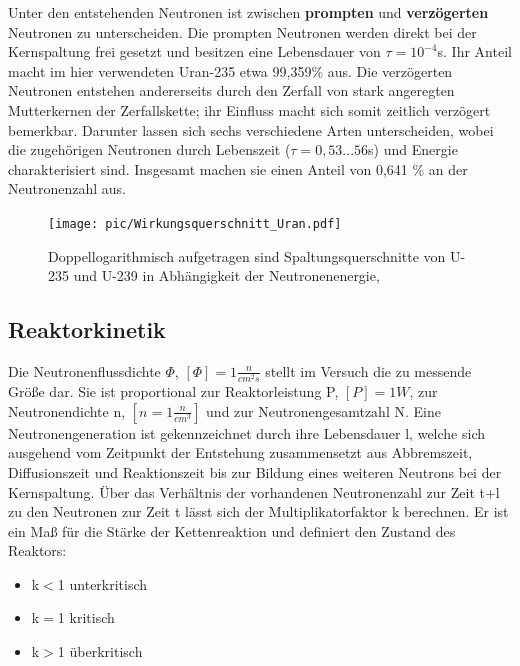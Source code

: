 	Unter den entstehenden Neutronen ist zwischen \textbf{prompten} und \textbf{verzögerten} Neutronen zu unterscheiden. Die prompten Neutronen werden direkt bei der Kernspaltung frei gesetzt und besitzen eine Lebensdauer von $\tau = 10^{-4}$s. Ihr Anteil macht im hier verwendeten Uran-235 etwa 99,359$\%$ aus. Die verzögerten Neutronen entstehen andererseits durch den Zerfall von stark angeregten Mutterkernen der Zerfallskette; ihr Einfluss macht sich somit zeitlich verzögert bemerkbar. Darunter lassen sich sechs verschiedene Arten unterscheiden, wobei die zugehörigen Neutronen durch Lebenszeit ($\tau = 0,53...56$s) und Energie charakterisiert sind. Insgesamt machen sie einen Anteil von 0,641 $\%$ an der Neutronenzahl aus.
	
	\begin{figure}[ht]
	\centering
	\texttt{[image: pic/Wirkungsquerschnitt\_Uran.pdf]}
	\caption{Doppellogarithmisch aufgetragen sind Spaltungsquerschnitte von U-235 und U-239 in Abhängigkeit der Neutronenenergie,\cite{Wirkungsquerschnitt_Uran}}
	\label{fig: Wirkungsquerschnitt_Uran}
	\end{figure} 
	
	\subsection{Reaktorkinetik}
	
	Die Neutronenflussdichte $\Phi$, $[\Phi]=1 \frac{n}{cm^{2}s}$ stellt im Versuch die zu messende Größe dar. Sie ist proportional zur Reaktorleistung P, $[P] = 1W$, zur Neutronendichte n, $[n= 1 \frac{n}{cm^{3}}]$ und zur Neutronengesamtzahl N.
	Eine Neutronengeneration ist gekennzeichnet durch ihre Lebensdauer l, welche sich ausgehend vom Zeitpunkt der Entstehung zusammensetzt aus Abbremszeit, Diffusionszeit und Reaktionszeit bis zur Bildung eines weiteren Neutrons bei der Kernspaltung.
	Über das Verhältnis der vorhandenen Neutronenzahl zur Zeit t+l zu den Neutronen zur Zeit t lässt sich der Multiplikatorfaktor k berechnen. Er ist ein Maß für die Stärke der Kettenreaktion und definiert den Zustand des Reaktors: 
	\begin{itemize}
	\item k$<$1 unterkritisch
	\item k$=$1 kritisch
	\item k$>$1 überkritisch
	\end{itemize}
	
